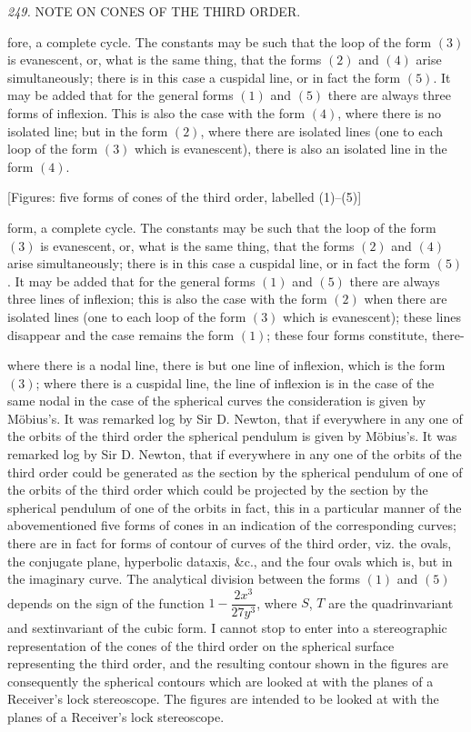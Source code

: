 \documentclass[11pt,a4paper]{article}
\begin{document}
\setcounter{page}{121}

\noindent\textit{249.} \quad NOTE ON CONES OF THE THIRD ORDER.

fore, a complete cycle. The constants may be such that the loop of the form $(3)$ is evanescent, or, what is the same thing, that the forms $(2)$ and $(4)$ arise simultaneously; there is in this case a cuspidal line, or in fact the form $(5)$. It may be added that for the general forms $(1)$ and $(5)$ there are always three forms of inflexion. This is also the case with the form $(4)$, where there is no isolated line; but in the form $(2)$, where there are isolated lines (one to each loop of the form $(3)$ which is evanescent), there is also an isolated line in the form $(4)$.

\begin{center}
[Figures: five forms of cones of the third order, labelled (1)--(5)]
\end{center}

\noindent
form, a complete cycle. The constants may be such that the loop of the form $(3)$ is evanescent, or, what is the same thing, that the forms $(2)$ and $(4)$ arise simultaneously; there is in this case a cuspidal line, or in fact the form $(5)$. It may be added that for the general forms $(1)$ and $(5)$ there are always three lines of inflexion; this is also the case with the form $(2)$ when there are isolated lines (one to each loop of the form $(3)$ which is evanescent); these lines disappear and the case remains the form $(1)$; these four forms constitute, there-

\setcounter{page}{122}

\noindent
where there is a nodal line, there is but one line of inflexion, which is the form $(3)$; where there is a cuspidal line, the line of inflexion is in the case of the same nodal in the case of the spherical curves the consideration is given by Möbius's. It was remarked log by Sir D. Newton, that if everywhere in any one of the orbits of the third order the spherical pendulum is given by Möbius's. It was remarked log by Sir D. Newton, that if everywhere in any one of the orbits of the third order could be generated as the section by the spherical pendulum of one of the orbits of the third order which could be projected by the section by the spherical pendulum of one of the orbits in fact, this in a particular manner of the abovementioned five forms of cones in an indication of the corresponding curves; there are in fact for forms of contour of curves of the third order, viz. the ovals, the conjugate plane, hyperbolic dataxis, &c., and the four ovals which is, but in the imaginary curve. The analytical division between the forms $(1)$ and $(5)$ depends on the sign of the function $1 - \dfrac{2x^3}{27y^3}$, where $S$, $T$ are the quadrinvariant and sextinvariant of the cubic form. I cannot stop to enter into a stereographic representation of the cones of the third order on the spherical surface representing the third order, and the resulting contour shown in the figures are consequently the spherical contours which are looked at with the planes of a Receiver's lock stereoscope. The figures are intended to be looked at with the planes of a Receiver's lock stereoscope.
\end{document}
